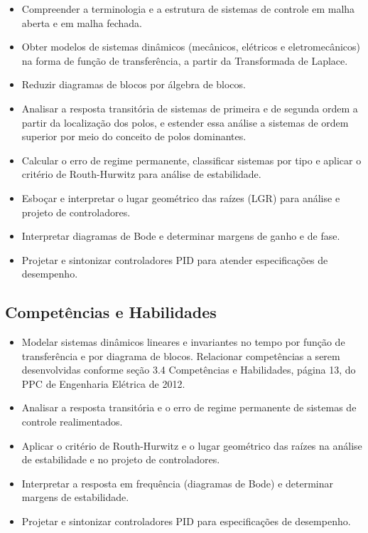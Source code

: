 \documentclass[oneside,a4paper,12pt]{article}
\begin{document}
\begin{itemize}
    \item Compreender a terminologia e a estrutura de sistemas de controle em malha aberta e em malha fechada.
    \item Obter modelos de sistemas dinâmicos (mecânicos, elétricos e eletromecânicos) na forma de função de transferência, a partir da Transformada de Laplace.
    \item Reduzir diagramas de blocos por álgebra de blocos.
    \item Analisar a resposta transitória de sistemas de primeira e de segunda ordem a partir da localização dos polos, e estender essa análise a sistemas de ordem superior por meio do conceito de polos dominantes.
    \item Calcular o erro de regime permanente, classificar sistemas por tipo e aplicar o critério de Routh-Hurwitz para análise de estabilidade.
    \item Esboçar e interpretar o lugar geométrico das raízes (LGR) para análise e projeto de controladores.
    \item Interpretar diagramas de Bode e determinar margens de ganho e de fase.
    \item Projetar e sintonizar controladores PID para atender especificações de desempenho.
\end{itemize}

\begin{snugshade}
  \section{Competências e Habilidades}
\end{snugshade}

\begin{itemize}

    \item Modelar sistemas dinâmicos lineares e invariantes no tempo por função de transferência e por diagrama de blocos. Relacionar competências a serem desenvolvidas conforme seção 3.4 Competências e Habilidades, página 13, do PPC de Engenharia Elétrica de 2012.

    \item Analisar a resposta transitória e o erro de regime permanente de sistemas de controle realimentados.

    \item Aplicar o critério de Routh-Hurwitz e o lugar geométrico das raízes na análise de estabilidade e no projeto de controladores.

    \item Interpretar a resposta em frequência (diagramas de Bode) e determinar margens de estabilidade.

    \item Projetar e sintonizar controladores PID para especificações de desempenho.

\end{itemize}
\end{document}
